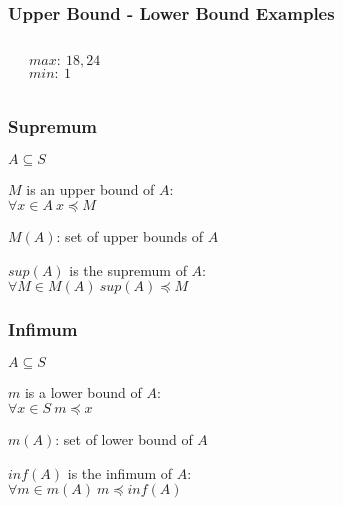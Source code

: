 \documentclass[dvipsnames]{beamer}
\begin{document}
\begin{frame}
  \frametitle{Upper Bound - Lower Bound Examples}

  \begin{example}
    \begin{columns}
      \begin{center}
      \end{center}

      $max:~18,24$\\
      $min:~1$
    \end{columns}
  \end{example}
\end{frame}

\begin{frame}
  \frametitle{Supremum}

  \begin{definition}
    $A \subseteq S$

    \medskip
    $M$ is an \alert{upper bound} of $A$:\\
    $\forall x \in A~x \preceq M$
  \end{definition}

  \pause
  \begin{definition}
    $M(A)$: set of upper bounds of $A$

    \medskip
    $sup(A)$ is the \alert{supremum} of $A$:\\
    $\forall M \in M(A)~sup(A) \preceq M$
  \end{definition}
\end{frame}

\begin{frame}
  \frametitle{Infimum}

  \begin{definition}
    $A \subseteq S$

    \medskip
    $m$ is a \alert{lower bound} of $A$:\\
    $\forall x \in S~m \preceq x$
  \end{definition}

  \pause
  \begin{definition}
    $m(A)$: set of lower bound of $A$

    \medskip
    $inf(A)$ is the \alert{infimum} of $A$:\\
    $\forall m \in m(A)~m \preceq inf(A)$
  \end{definition}
\end{frame}
\end{document}
